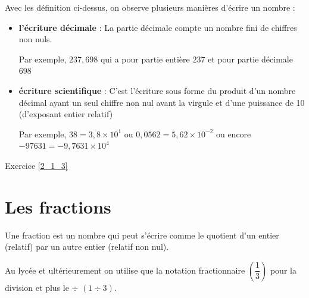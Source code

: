 \bigbreak
Avec les définition ci-dessus, on observe plusieurs manières d'écrire un nombre :

\begin{itemize}
\item \textbf{l'écriture décimale} : La partie décimale compte un nombre fini de chiffres non nuls.

Par exemple, $237,698$ qui a pour partie entière $237$ et pour partie décimale $698$

\item \textbf{écriture scientifique} : C'est l'écriture sous forme du produit d'un nombre décimal ayant un seul chiffre non nul avant la virgule et d'une puissance de 10 (d'exposant entier relatif) 

Par exemple, $38 = 3,8 \times 10^1$ \hspace{0.8cm} ou \hspace{0.8cm} $0,0562 = 5,62 \times 10^{-2}$ \hspace{0.8cm}ou  encore \hspace{0.8cm} $-97631 = - 9,7631 \times 10^{4}$
\end{itemize}

\begin{exec}
\hspace{0.5cm} \hypertarget{Ex_2_1_3}{} Exercice \ref{2_1_3} \hspace{0.5cm}
\end{exec}

\section{Les fractions}

\begin{defi}{}{}
Une fraction est un nombre qui peut s'écrire comme le quotient d'un entier (relatif) par un autre entier (relatif non nul).
\end{defi}
\medskip

\noindent Au lycée et ultérieurement on utilise que la notation fractionnaire $\left(\dfrac{1}{3}\right)$ pour la division et plus le $\div$ $(1 \div 3)$.
\medskip

